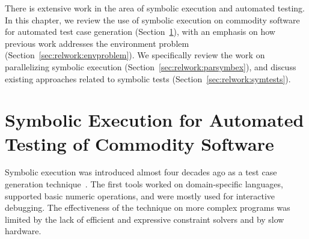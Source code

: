 There is extensive work in the area of symbolic execution and automated testing.  In this chapter, we review the use of symbolic execution on commodity software for automated test case generation (Section~\ref{sec:relwork:atcg}), with an emphasis on how previous work addresses the environment problem (Section~\ref{sec:relwork:envproblem}).  We specifically review the work on parallelizing symbolic execution (Section~\ref{sec:relwork:parsymbex}), and discuss existing approaches related to symbolic tests (Section~\ref{sec:relwork:symtests}).


\section{Symbolic Execution for Automated Testing of Commodity Software}
\label{sec:relwork:atcg}



Symbolic execution was introduced almost four decades ago as a test case generation technique~\cite{king:symbolic:2, boyer:symbolic}.  The first tools worked on domain-specific languages, supported basic numeric operations, and were mostly used for interactive debugging.  The effectiveness of the technique on more complex programs was limited by the lack of efficient and expressive constraint solvers and by slow hardware.


